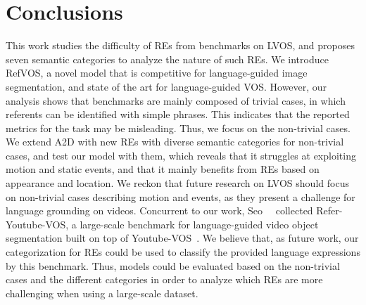 \documentclass[10pt,twocolumn,letterpaper]{article}
\begin{document}
\section{Conclusions}
\label{sec:conclusions}






This work studies the difficulty of REs from benchmarks on LVOS, and proposes seven semantic categories to analyze the nature of such REs. We introduce RefVOS, a novel model that is competitive for language-guided image segmentation, and state of the art for language-guided VOS. However, our analysis shows that benchmarks are mainly composed of trivial cases, in which referents can be identified with simple phrases. This indicates that the reported metrics for the task may be misleading. Thus, we focus on the non-trivial cases. We extend A2D with new REs with diverse semantic categories for non-trivial cases, and test our model with them, which reveals that it struggles at exploiting motion and static events, and that it mainly benefits from REs based on appearance and location. We reckon that future research on LVOS should focus on non-trivial cases describing motion and events, as they present a challenge for language grounding on videos. Concurrent to our work, Seo~\etal~\cite{seourvos} collected Refer-Youtube-VOS, a large-scale benchmark for language-guided video object segmentation built on top of Youtube-VOS~\cite{xu2018youtube}. We believe that, as future work, our categorization for REs could be used to classify the provided language expressions by this benchmark. Thus, models could be evaluated based on the non-trivial cases and the different categories in order to analyze which REs are more challenging when using a large-scale dataset.























 

{\small


}
\end{document}
